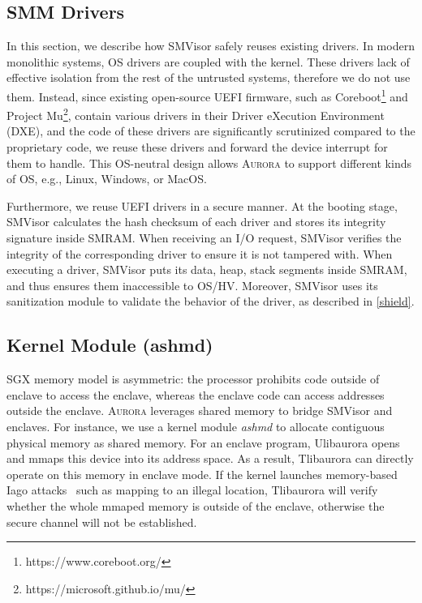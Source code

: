 \subsection{SMM Drivers}\label{driver}
In this section, we describe how SMVisor safely reuses existing drivers. In modern monolithic systems, OS drivers are coupled with the kernel. These drivers lack of effective isolation from the rest of the untrusted systems, therefore we do not use them. Instead, since existing open-source UEFI firmware, such as Coreboot\footnote{https://www.coreboot.org/} and Project Mu\footnote{https://microsoft.github.io/mu/}, contain various drivers in their Driver eXecution Environment (DXE), and the code of these drivers are significantly scrutinized compared to the proprietary code, we reuse these drivers and forward the device interrupt for them to handle. This OS-neutral design allows \textsc{Aurora} to support different kinds of OS, e.g., Linux, Windows, or MacOS.

Furthermore, we reuse UEFI drivers in a secure manner. At the booting stage, SMVisor calculates the hash checksum of each driver and stores its integrity signature inside SMRAM. When receiving an I/O request, SMVisor verifies the integrity of the corresponding driver to ensure it is not tampered with. When executing a driver, SMVisor puts its data, heap, stack segments inside SMRAM, and thus ensures them inaccessible to OS/HV. Moreover, SMVisor uses its sanitization module to validate the behavior of the driver, as described in \autoref{shield}.

\subsection{Kernel Module (ashmd)}
SGX memory model is asymmetric: the processor prohibits code outside of enclave to access the enclave, whereas the enclave code can access addresses outside the enclave. \textsc{Aurora} leverages shared memory to bridge SMVisor and enclaves. For instance, we use a kernel module \emph{ashmd} to allocate contiguous physical memory as shared memory. For an enclave program, Ulibaurora opens and mmaps this device into its  address space. As a result, Tlibaurora can directly operate on this memory in enclave mode. If the kernel launches memory-based Iago attacks~\cite{DBLP:conf/asplos/CheckowayS13} such as mapping to an illegal location, Tlibaurora will verify whether the whole mmaped memory is outside of the enclave, otherwise the secure channel will not be established. 

